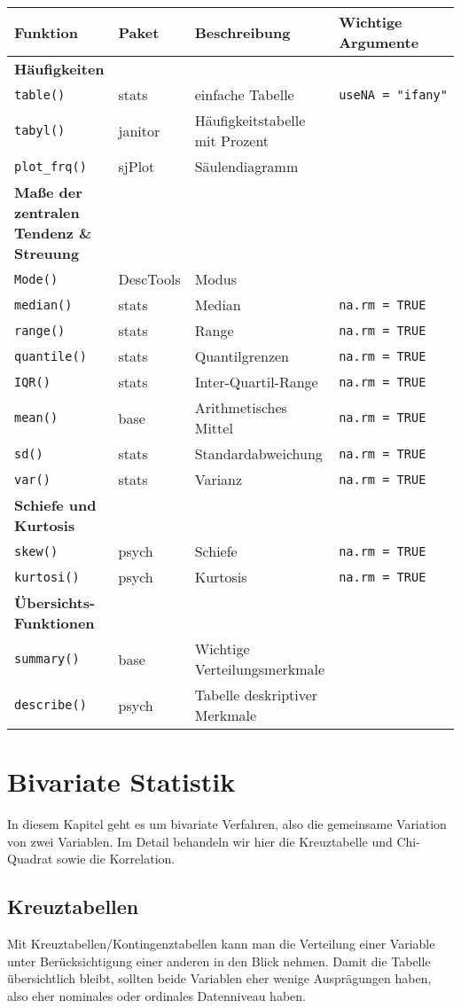 \documentclass[
]{book}
\begin{document}
\begin{longtable}[]{@{}llll@{}}
\toprule
Funktion & Paket & Beschreibung & Wichtige Argumente\tabularnewline
\midrule
\endhead
\textbf{Häufigkeiten} & & &\tabularnewline
\texttt{table()} & stats & einfache Tabelle & \texttt{useNA\ =\ "ifany"}\tabularnewline
\texttt{tabyl()} & janitor & Häufigkeitstabelle mit Prozent &\tabularnewline
\texttt{plot\_frq()} & sjPlot & Säulendiagramm &\tabularnewline
\textbf{Maße der zentralen Tendenz \& Streuung} & & &\tabularnewline
\texttt{Mode()} & DescTools & Modus &\tabularnewline
\texttt{median()} & stats & Median & \texttt{na.rm\ =\ TRUE}\tabularnewline
\texttt{range()} & stats & Range & \texttt{na.rm\ =\ TRUE}\tabularnewline
\texttt{quantile()} & stats & Quantilgrenzen & \texttt{na.rm\ =\ TRUE}\tabularnewline
\texttt{IQR()} & stats & Inter-Quartil-Range & \texttt{na.rm\ =\ TRUE}\tabularnewline
\texttt{mean()} & base & Arithmetisches Mittel & \texttt{na.rm\ =\ TRUE}\tabularnewline
\texttt{sd()} & stats & Standardabweichung & \texttt{na.rm\ =\ TRUE}\tabularnewline
\texttt{var()} & stats & Varianz & \texttt{na.rm\ =\ TRUE}\tabularnewline
\textbf{Schiefe und Kurtosis} & & &\tabularnewline
\texttt{skew()} & psych & Schiefe & \texttt{na.rm\ =\ TRUE}\tabularnewline
\texttt{kurtosi()} & psych & Kurtosis & \texttt{na.rm\ =\ TRUE}\tabularnewline
\textbf{Übersichts-Funktionen} & & &\tabularnewline
\texttt{summary()} & base & Wichtige Verteilungsmerkmale &\tabularnewline
\texttt{describe()} & psych & Tabelle deskriptiver Merkmale &\tabularnewline
\bottomrule
\end{longtable}

\hypertarget{bivariate-statistik}{%
\chapter{Bivariate Statistik}\label{bivariate-statistik}}

In diesem Kapitel geht es um bivariate Verfahren, also die gemeinsame Variation von zwei Variablen. Im Detail behandeln wir hier die Kreuztabelle und Chi-Quadrat sowie die Korrelation.

\hypertarget{kreuztabellen}{%
\section{Kreuztabellen}\label{kreuztabellen}}

Mit Kreuztabellen/Kontingenztabellen kann man die Verteilung einer Variable unter Berücksichtigung einer anderen in den Blick nehmen. Damit die Tabelle übersichtlich bleibt, sollten beide Variablen eher wenige Ausprägungen haben, also eher nominales oder ordinales Datenniveau haben.
\end{document}
